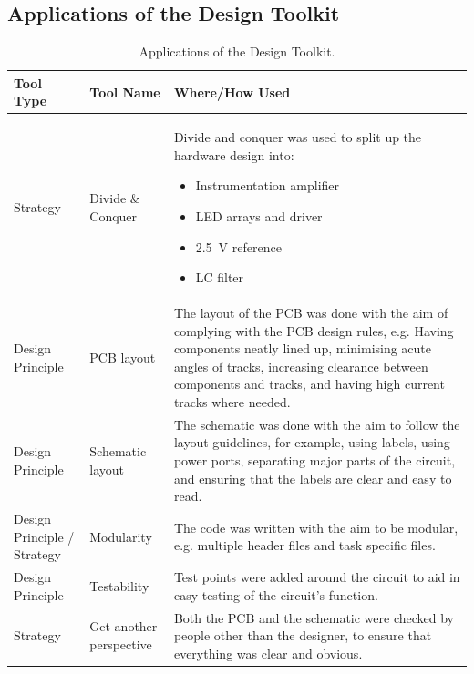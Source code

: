\documentclass[twoside]{article}
\begin{document}
\newpage
\begin{appendices}
    \section{Applications of the Design Toolkit}
        \begin{table}[h]
            \centering
            \caption{Applications of the Design Toolkit.} \label{table:designtoolkit}
            \begin{tabularx}{\linewidth}{l l X}
                \toprule
                Tool Type & Tool Name & Where/How Used \\
                \midrule
                Strategy & Divide \& Conquer & Divide and conquer was used to split up the hardware design into:
                \begin{itemize}
                    \item Instrumentation amplifier
                    \item LED arrays and driver
                    \item \SI{2.5}{\volt} reference
                    \item LC filter
                \end{itemize}  \\
                Design Principle & PCB layout & The layout of the PCB was done with the aim of complying with the PCB design rules, e.g. Having components neatly lined up, minimising acute angles of tracks, increasing clearance between components and tracks, and having high current tracks where needed. \\
                Design Principle & Schematic layout & The schematic was done with the aim to follow the layout guidelines, for example, using labels, using power ports, separating major parts of the circuit, and ensuring that the labels are clear and easy to read. \\
                Design Principle / Strategy & Modularity & The code was written with the aim to be modular, e.g. multiple header files and task specific files. \\
                Design Principle & Testability & Test points were added around the circuit to aid in easy testing of the circuit's function. \\
                Strategy & Get another perspective & Both the PCB and the schematic were checked by people other than the designer, to ensure that everything was clear and obvious. \\

\end{tabularx}
\end{table}
\end{appendices}
\end{document}
